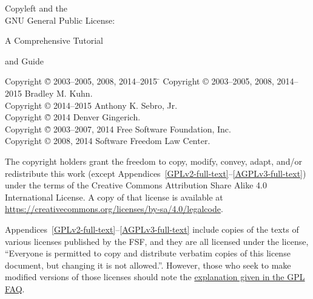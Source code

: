\documentclass[10pt, letterpaper, openany, oneside]{book}
\begin{document}
\pagestyle{plain}

\frontmatter

\begin{titlepage}

\begin{center}

{\Huge
{\sc Copyleft and the  \\

GNU General Public License:

\vspace{.25in}

A Comprehensive Tutorial \\

\vspace{.1in}

and Guide
}}
\vfill

{\parindent 0in
\begin{tabbing}
Copyright \= \copyright{} 2003--2005, 2008, 2014--2015 \hspace{1.mm} \=  \kill
Copyright \> \copyright{} 2003--2005, 2008, 2014--2015 \>  Bradley M. Kuhn. \\
Copyright \> \copyright{} 2014--2015 \>  Anthony K. Sebro, Jr. \\
Copyright \= \copyright{} 2014 \> Denver Gingerich. \\
Copyright \= \copyright{} 2003--2007, 2014 \>  Free Software Foundation, Inc. \\
Copyright \> \copyright{} 2008, 2014 \>  Software Freedom Law Center. \\
\end{tabbing}

\vspace{.3in}

The copyright holders grant the freedom to copy, modify, convey,
adapt, and/or redistribute this work (except
Appendices~\ref{GPLv2-full-text}--\ref{AGPLv3-full-text}) under the terms of the Creative Commons
Attribution Share Alike 4.0 International License.  A copy of that license is
available at \url{https://creativecommons.org/licenses/by-sa/4.0/legalcode}.

Appendices~\ref{GPLv2-full-text}--\ref{AGPLv3-full-text} include copies of the texts of various licenses published
by the FSF, and they are all licensed under the license, ``Everyone is permitted
to copy and distribute verbatim copies of this license document, but changing
it is not allowed.''.  However, those who seek to make modified versions of
those licenses should note the
\href{https://www.gnu.org/licenses/gpl-faq.html#ModifyGPL}{explanation given in the GPL FAQ}.

}
\end{center}
\end{titlepage}
\end{document}
